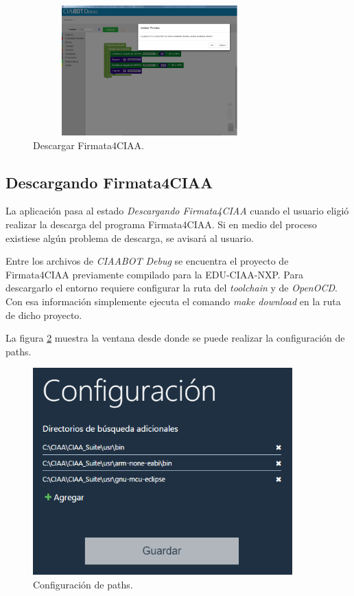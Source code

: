 \begin{figure}[!htbp]
	\begin{center}  %
		\includegraphics*[width=9cm,height=5cm]{./Figures/instalar-firmata.png}
		\par\caption{Descargar Firmata4CIAA.}\label{fig:instalar-firmata}
	\end{center}
\end{figure}

\subsection{Descargando Firmata4CIAA}
\label{subsec:Descargando Firmata4CIAA}

La aplicación pasa al estado \emph{Descargando Firmata4CIAA} cuando el usuario eligió realizar la descarga del programa Firmata4CIAA. Si en medio del proceso existiese algún problema de descarga, se avisará al usuario.

Entre los archivos de \emph{CIAABOT Debug} se encuentra el proyecto de Firmata4CIAA previamente compilado para la EDU-CIAA-NXP. Para descargarlo el entorno requiere configurar la ruta del \emph{toolchain} y de \emph{OpenOCD}. Con esa información simplemente ejecuta el comando \emph{make download} en la ruta de dicho proyecto.

La figura \ref{fig:Configuracion} muestra la ventana desde donde se puede realizar la configuración de paths.

\begin{figure}[!htbp]
	\begin{center}  %
		\includegraphics*[width=10cm]{./Figures/Configuracion.PNG}
		\par\caption{Configuración de paths.}\label{fig:Configuracion}
	\end{center}
\end{figure}


